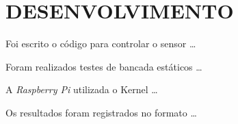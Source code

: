 \chapter{DESENVOLVIMENTO}\label{chap:desenvolvimento}

Foi escrito o código para controlar o sensor \ldots

Foram realizados testes de bancada estáticos \ldots

A \emph{Raspberry Pi} utilizada o Kernel \ldots

Os resultados foram registrados no formato \ldots
